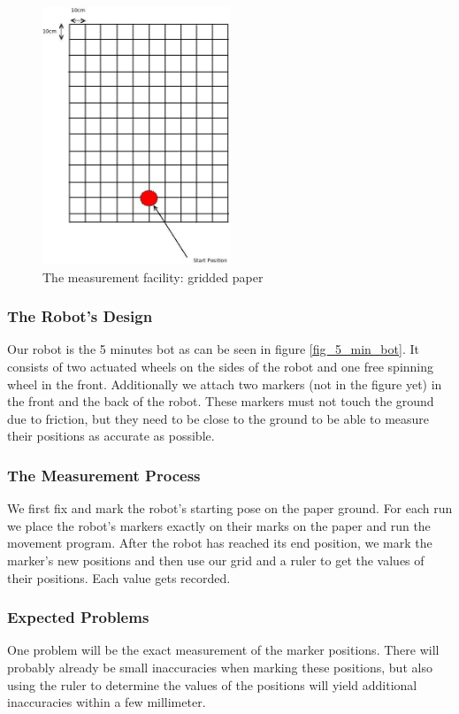 \documentclass[paper=a4, fontsize=11pt]{scrartcl} %
\numberwithin{equation}{section} %
\numberwithin{figure}{section} %
\numberwithin{table}{section} %
\begin{document}
\begin{figure}[ht]
	\centering
  \includegraphics[width=0.5\textwidth]{facility.jpeg}
	\caption{The measurement facility: gridded paper}
	\label{fig_facility}
\end{figure}
\subsubsection{The Robot's Design}
Our robot is the 5 minutes bot as can be seen in figure \ref{fig_5_min_bot}.
It consists of two actuated wheels on the sides of the robot and one free spinning wheel in the front.
Additionally we attach two markers (not in the figure yet) in the front and the back of the robot. 
These markers must not touch the ground due to friction, but they need to be close to the ground to be able to measure their positions as accurate as possible.

\subsubsection{The Measurement Process}
We first fix and mark the robot's starting pose on the paper ground.
For each run we place the robot's markers exactly on their marks on the paper and run the movement program.
After the robot has reached its end position, we mark the marker's new positions and then use our grid and a ruler to get the values of their positions.
Each value gets recorded.

\subsubsection{Expected Problems}
One problem will be the exact measurement of the marker positions. 
There will probably already be small inaccuracies when marking these positions, but also using the ruler to determine the values of the positions will yield additional inaccuracies within a few millimeter.
\end{document}
